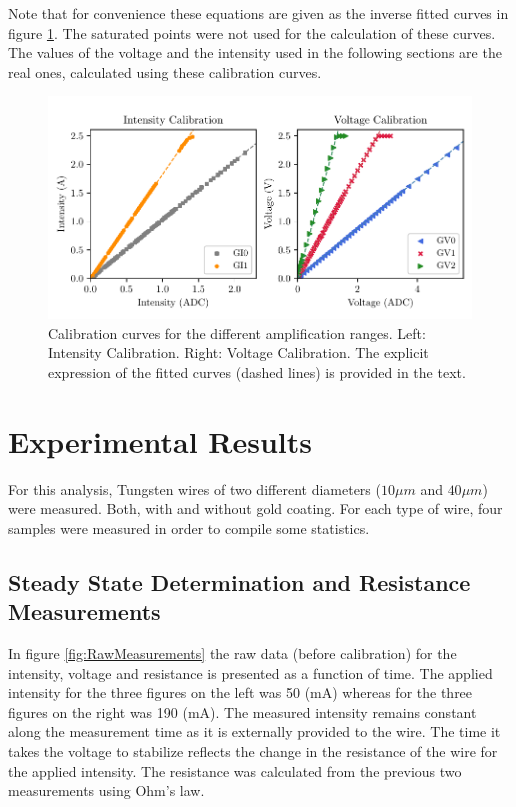 Note that for convenience these equations are given as the inverse fitted curves in figure \ref{fig:CalibrationCurves}. The saturated points were not used for the calculation of these curves. The values of the voltage and the intensity used in the following sections are the real ones, calculated using these calibration curves.

\begin{figure}[h]
    \centering
    \includegraphics[width=1.0\columnwidth]{Figure_CalibrationCurves/CalCurve.pdf}
    \caption{Calibration curves for the different amplification ranges. Left: Intensity Calibration. Right: Voltage Calibration. The explicit expression of the fitted curves (dashed lines) is provided in the text. }
    \label{fig:CalibrationCurves}
\end{figure}

\section{Experimental Results}

For this analysis, Tungsten wires of two different diameters ($10 \mu m$ and $40 \mu m$) were measured. Both, with and without gold coating. For each type of wire, four samples were measured in order to compile some statistics. 

\subsection{Steady State Determination and Resistance Measurements}

In figure \ref{fig:RawMeasurements} the raw data (before calibration) for the intensity, voltage and resistance is presented as a function of time. The applied intensity for the three figures on the left was 50 (mA) whereas for the three figures on the right was 190 (mA). The measured intensity remains constant along the measurement time as it is externally provided to the wire. The time it takes the voltage to stabilize reflects the change in the resistance of the wire for the applied intensity. The resistance was calculated from the previous two measurements using Ohm's law. 

